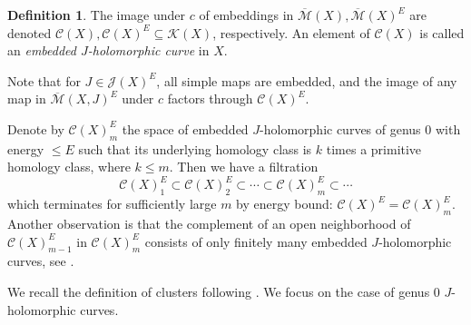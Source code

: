 \documentclass[reqno]{amsart}
\numberwithin{equation}{section}
\numberwithin{equation}{section}
\numberwithin{equation}{section}
\theoremstyle{definition}
\newtheorem{defn}[thm]{Definition}
\theoremstyle{remark}
\theoremstyle{remark}
\newcommand{\ov}{\overline}
\begin{document}
\begin{defn}
    The image under $c$ of embeddings in $\overline{\mathcal{M}}(X), \ov{\mathcal{M}}(X)^E$ are denoted $\mathcal{C}(X), \mathcal{C}(X)^E \subseteq \mathcal{K}(X)$, respectively. An element of $\mathcal{C}(X)$ is called an \emph{embedded $J$-holomorphic curve} in $X$. 
\end{defn}

Note that for $J \in \mathcal{J}(X)^E$, all simple maps are embedded, and the image of any map in $\ov{\mathcal{M}}(X, J)^E$ under $c$ factors through $\mathcal{C}(X)^E$.

Denote by $\mathcal{C}(X)^E_m$ the space of embedded $J$-holomorphic curves of genus $0$ with energy $\leq E$ such that its underlying homology class is $k$ times a primitive homology class, where $k \leq m$. Then we have a filtration
\begin{equation}
    \mathcal{C}(X)^E_1 \subset
    \mathcal{C}(X)^E_2 \subset \cdots \subset \mathcal{C}(X)^E_m \subset \cdots
\end{equation}
which terminates for sufficiently large $m$ by energy bound: $\mathcal{C}(X)^E = \mathcal{C}(X)^E_m$. Another observation is that the complement of an open neighborhood of $\mathcal{C}(X)^E_{m-1}$ in $\mathcal{C}(X)^E_m$ consists of only finitely many embedded $J$-holomorphic curves, see \cite[Lemma 1.6]{IP-GV}.

We recall the definition of clusters following \cite{IP-GV, doan2021gopakumar}. We focus on the case of genus $0$ $J$-holomorphic curves.
\end{document}
